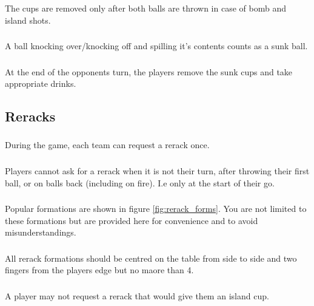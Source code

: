		\subsubsection{}\label{sssec:Sinking,cups_away}
			The cups are removed only after both balls are thrown in case of bomb and island shots.
		\subsubsection{}\label{sssec:Sinking,knockedover}
			A ball knocking over/knocking off and spilling it's contents counts as a sunk ball. 
		\subsubsection{}\label{sssec:Sinking,cups_drinking}
			At the end of the opponents turn, the players remove the sunk cups and take appropriate drinks.

	\subsection{Reracks}\label{ssec:Rerack}
		\subsubsection{}\label{sssec:Rerack,number}
			During the game, each team can request a rerack once.
		\subsubsection{}\label{sssec:Rerack,notallowed}
			Players cannot ask for a rerack when it is not their turn, after throwing their first ball, or on balls back (including on fire).
            I.e only at the start of their go.
		\subsubsection{}\label{sssec:Rerack,pop_forms}
			Popular formations are shown in figure \ref{fig:rerack_forms}.
            You are not limited to these formations but are provided here for convenience and to avoid misunderstandings. 
		\subsubsection{}\label{sssec:Rerack,centering}
			All rerack formations should be centred on the table from side to side and two fingers from the players edge but no maore than 4.
		\subsubsection{}\label{sssec:Rerack,Island}
			A player may not request a rerack that would give them an island cup.
